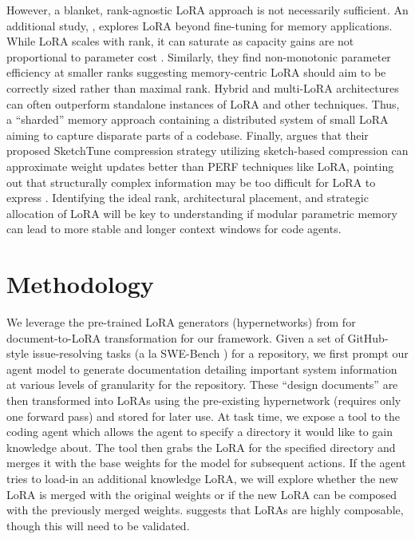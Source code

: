 \documentclass{article}
\begin{document}
However, a blanket, rank-agnostic LoRA approach is not necessarily sufficient. An additional study, \citeauthor{back2026understandingloraknowledgememory}, explores LoRA beyond fine-tuning for memory applications. While LoRA scales with rank, it can saturate as capacity gains are not proportional to parameter cost \cite{back2026understandingloraknowledgememory}. Similarly, they find non-monotonic parameter efficiency at smaller ranks suggesting memory-centric LoRA should aim to be correctly sized rather than maximal rank. Hybrid and multi-LoRA architectures can often outperform standalone instances of LoRA and other techniques. Thus, a ``sharded'' memory approach containing a distributed system of small LoRA aiming to capture disparate parts of a codebase. Finally, \citeauthor{zhang2026sketchadaptfinetunablesketches} argues that their proposed SketchTune compression strategy utilizing sketch-based compression can approximate weight updates better than PERF techniques like LoRA, pointing out that structurally complex information may be too difficult for LoRA to express \cite{zhang2026sketchadaptfinetunablesketches}. Identifying the ideal rank, architectural placement, and strategic allocation of LoRA will be key to understanding if modular parametric memory can lead to more stable and longer context windows for code agents. 

\section{Methodology}

We leverage the pre-trained LoRA generators (hypernetworks) from \citeauthor{doctolora} for document-to-LoRA transformation for our framework. Given a set of GitHub-style issue-resolving tasks (a la SWE-Bench \cite{jimenez2024swebenchlanguagemodelsresolve}) for a repository, we first prompt our agent model to generate documentation detailing important system information at various levels of granularity for the repository. These ``design documents'' are then transformed into LoRAs using the pre-existing hypernetwork (requires only one forward pass) and stored for later use. At task time, we expose a tool to the coding agent which allows the agent to specify a directory it would like to gain knowledge about. The tool then grabs the LoRA for the specified directory and merges it with the base weights for the model for subsequent actions. If the agent tries to load-in an additional knowledge LoRA, we will explore whether the new LoRA is merged with the original weights or if the new LoRA can be composed with the previously merged weights. \citeauthor{doctolora} suggests that LoRAs are highly composable, though this will need to be validated.
\end{document}
